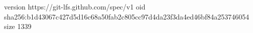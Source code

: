 version https://git-lfs.github.com/spec/v1
oid sha256:b1d43067c427d5d16c68a50fab2c805cc97d4da23f3da4ed46bf84a253746054
size 1339
